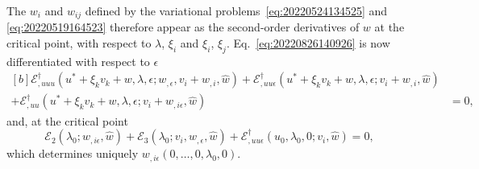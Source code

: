 \documentclass[12pt, final]{scrartcl}
\theoremstyle{definition}
\newcommand{\E}{\mathcal E}
\newcommand{\EE}{\mathcal E ^ \dagger}
\begin{document}
The $w_i$ and $w_{ij}$ defined by the variational problems~\eqref{eq:20220524134525} and \eqref{eq:20220519164523}
therefore appear as the second-order derivatives of $w$ at the critical point, with respect to $\lambda$, $\xi_i$ and
$\xi_i$, $\xi_j$. Eq.~\eqref{eq:20220826140926} is now differentiated with respect to \(\epsilon\)
\begin{equation}
  \begin{aligned}[b]
    \EE_{,uuu}(u^\ast + \xi_k v_k + w, \lambda, \epsilon; w_{,\epsilon}, v_i + w_{,i}, \hat{w}) + \EE_{,uu\epsilon}(u^\ast + \xi_k v_k + w, \lambda, \epsilon; v_i + w_{,i}, \hat{w}) &\\
    + \EE_{,uu}(u^\ast + \xi_k v_k + w, \lambda, \epsilon; v_i + w_{,i\epsilon}, \hat{w}) &= 0,
  \end{aligned}
\end{equation}
and, at the critical point
\begin{equation}
  \E_2(\lambda_0; w_{,i\epsilon}, \hat{w}) + \E_3(\lambda_0; v_i, w_{,\epsilon}, \hat{w}) + \EE_{,uu\epsilon}(u_0, \lambda_0, 0; v_i, \hat{w}) = 0,
\end{equation}
which determines uniquely \(w_{,i\epsilon}(0, \ldots, 0, \lambda_0, 0)\).
\end{document}
